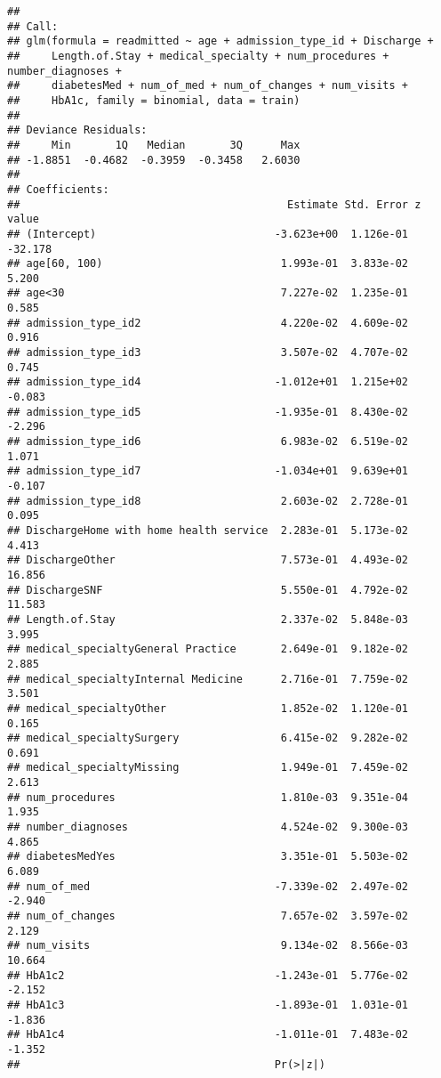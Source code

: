 \documentclass[
]{article}
\begin{document}
\begin{verbatim}
## 
## Call:
## glm(formula = readmitted ~ age + admission_type_id + Discharge + 
##     Length.of.Stay + medical_specialty + num_procedures + number_diagnoses + 
##     diabetesMed + num_of_med + num_of_changes + num_visits + 
##     HbA1c, family = binomial, data = train)
## 
## Deviance Residuals: 
##     Min       1Q   Median       3Q      Max  
## -1.8851  -0.4682  -0.3959  -0.3458   2.6030  
## 
## Coefficients:
##                                          Estimate Std. Error z value
## (Intercept)                            -3.623e+00  1.126e-01 -32.178
## age[60, 100)                            1.993e-01  3.833e-02   5.200
## age<30                                  7.227e-02  1.235e-01   0.585
## admission_type_id2                      4.220e-02  4.609e-02   0.916
## admission_type_id3                      3.507e-02  4.707e-02   0.745
## admission_type_id4                     -1.012e+01  1.215e+02  -0.083
## admission_type_id5                     -1.935e-01  8.430e-02  -2.296
## admission_type_id6                      6.983e-02  6.519e-02   1.071
## admission_type_id7                     -1.034e+01  9.639e+01  -0.107
## admission_type_id8                      2.603e-02  2.728e-01   0.095
## DischargeHome with home health service  2.283e-01  5.173e-02   4.413
## DischargeOther                          7.573e-01  4.493e-02  16.856
## DischargeSNF                            5.550e-01  4.792e-02  11.583
## Length.of.Stay                          2.337e-02  5.848e-03   3.995
## medical_specialtyGeneral Practice       2.649e-01  9.182e-02   2.885
## medical_specialtyInternal Medicine      2.716e-01  7.759e-02   3.501
## medical_specialtyOther                  1.852e-02  1.120e-01   0.165
## medical_specialtySurgery                6.415e-02  9.282e-02   0.691
## medical_specialtyMissing                1.949e-01  7.459e-02   2.613
## num_procedures                          1.810e-03  9.351e-04   1.935
## number_diagnoses                        4.524e-02  9.300e-03   4.865
## diabetesMedYes                          3.351e-01  5.503e-02   6.089
## num_of_med                             -7.339e-02  2.497e-02  -2.940
## num_of_changes                          7.657e-02  3.597e-02   2.129
## num_visits                              9.134e-02  8.566e-03  10.664
## HbA1c2                                 -1.243e-01  5.776e-02  -2.152
## HbA1c3                                 -1.893e-01  1.031e-01  -1.836
## HbA1c4                                 -1.011e-01  7.483e-02  -1.352
##                                        Pr(>|z|)    

\end{verbatim}
\end{document}
